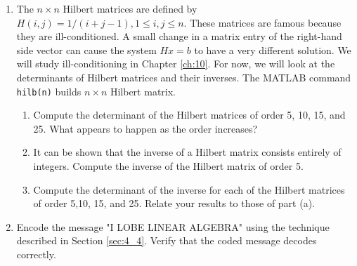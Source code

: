\documentclass[../main.tex]{subfiles}
\begin{document}
\begin{enumerate}[label=\textbf{\thechapter.\arabic{*}}, resume ]
  \item \label{pr:4_30} The \(n \times n\) Hilbert matrices are defined by \(H(i,j) = 1/(i+j-1), 1 \leq i, j \leq n\). These matrices are famous because they are ill-conditioned. A small change in a matrix entry of the right-hand side vector can cause the system \(Hx = b\) to have a very different solution. We will study ill-conditioning in Chapter \ref{ch:10}. For now, we will look at the determinants of Hilbert matrices and their inverses. The MATLAB command \texttt{hilb(n)} builds \(n \times n\) Hilbert matrix.
  \begin{enumerate}[leftmargin=*, label=\textbf{\alph{*}.}]
    \item Compute the determinant of the Hilbert matrices of order 5, 10, 15, and 25. What appears to happen as the order increases?
    \item It can be shown that the inverse of a Hilbert matrix consists entirely of integers. Compute the inverse of the Hilbert matrix of order 5.
    \item Compute the determinant of the inverse for each of the Hilbert matrices of order 5,10, 15, and 25. Relate your results to those of part (a).
  \end{enumerate}
  
  \item \label{pr:4_31} Encode the message "I LOBE LINEAR ALGEBRA" using the technique described in Section \ref{sec:4_4}. Verify that the coded message decodes correctly.
  
\end{enumerate}
\end{document}
